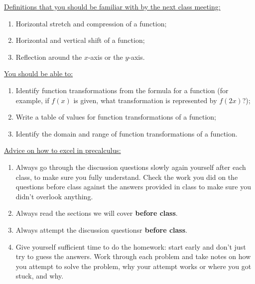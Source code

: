 \documentclass[12pt,dvipsnames]{article}
\begin{document}
 \begin{mdframed}[style=exampledefault,frametitle={Looking Ahead to Next Week...}]
 	{\underline{Definitions that you should be familiar with by the next class meeting:} }
 	\begin{enumerate}[label= {  \arabic*:},labelindent=2em, style = standard,leftmargin=4pc, labelsep=*, noitemsep]
 		\item Horizontal stretch and compression of a function;
                     \item Horizontal and vertical shift of a function;
                     \item Reflection around the $x$-axis or the $y$-axis.
 		
 	\end{enumerate}
 	{\underline{You should be able to:} }
 	\begin{enumerate}[label= {  \arabic*:},labelindent=2em, style = standard,leftmargin=4pc, labelsep=*, noitemsep]
 		\item Identify function transformations from the formula for a function (for example, if $f(x)$ is given, what transformation is represented by $f(2x)$?);
                     \item Write a table of values for function transformations of a function;
                     \item Identify the domain and range of function transformations of a function.
 	\end{enumerate}
{\underline{Advice on how to excel in precalculus:} }
\begin{enumerate}[label= {  \arabic*:},labelindent=2em, style = standard,leftmargin=4pc, labelsep=*, noitemsep]
 		\item  Always go through the discussion questions slowly again yourself after each class, to make sure you fully understand.
Check the  work you did on the questions before class against the answers provided in class to make sure you didn’t overlook anything.
\item Always read the sections we will cover{\bf{ before class}}.
\item Always attempt the discussion questionsr{\bf{ before class}}.
\item Give yourself sufficient time to do the homework: start early and don't just try to guess the answers. Work through each problem and take notes on how you attempt to solve the problem, why your attempt works or where you got stuck, and why.
\end{enumerate}
 	\end{mdframed}
\end{document}
